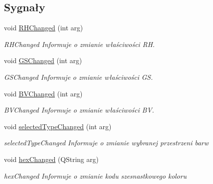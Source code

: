 \subsection*{Sygnały}
\begin{DoxyCompactItemize}
\item 
void \mbox{\hyperlink{class_color_view_model_ae82220bcc3ce7136ae025d8ba84c1ef5}{R\+H\+Changed}} (int arg)
\begin{DoxyCompactList}\small\item\em R\+H\+Changed Informuje o zmianie właściwości RH. \end{DoxyCompactList}\item 
void \mbox{\hyperlink{class_color_view_model_ab36d827240046bae55a0a7e18b50fcc3}{G\+S\+Changed}} (int arg)
\begin{DoxyCompactList}\small\item\em G\+S\+Changed Informuje o zmianie właściwości GS. \end{DoxyCompactList}\item 
void \mbox{\hyperlink{class_color_view_model_a242d8b688b15906ff79ab0a01f5877fc}{B\+V\+Changed}} (int arg)
\begin{DoxyCompactList}\small\item\em B\+V\+Changed Informuje o zmianie właściwości BV. \end{DoxyCompactList}\item 
void \mbox{\hyperlink{class_color_view_model_a40e736b58e641078c43dcf146a4b53bd}{selected\+Type\+Changed}} (int arg)
\begin{DoxyCompactList}\small\item\em selected\+Type\+Changed Informuje o zmianie wybranej przestrzeni barw \end{DoxyCompactList}\item 
void \mbox{\hyperlink{class_color_view_model_aff6ce1151bebe9048a61b99742ad6492}{hex\+Changed}} (Q\+String arg)
\begin{DoxyCompactList}\small\item\em hex\+Changed Informuje o zmianie kodu szesnastkowego koloru \end{DoxyCompactList}\end{DoxyCompactItemize}
